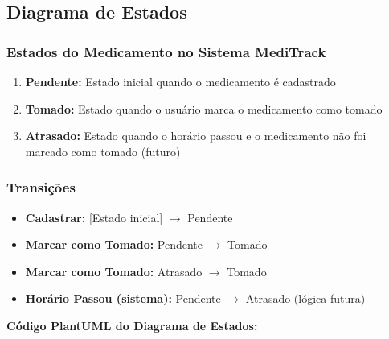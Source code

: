 \documentclass[12pt]{article}
\begin{document}
\subsection{Diagrama de Estados}

\subsubsection{Estados do Medicamento no Sistema MediTrack}

\begin{enumerate}
    \item \textbf{Pendente:} Estado inicial quando o medicamento é cadastrado
    \item \textbf{Tomado:} Estado quando o usuário marca o medicamento como tomado
    \item \textbf{Atrasado:} Estado quando o horário passou e o medicamento não foi marcado como tomado (futuro)
\end{enumerate}

\subsubsection{Transições}

\begin{itemize}
    \item \textbf{Cadastrar:} [Estado inicial] $\rightarrow$ Pendente
    \item \textbf{Marcar como Tomado:} Pendente $\rightarrow$ Tomado
    \item \textbf{Marcar como Tomado:} Atrasado $\rightarrow$ Tomado
    \item \textbf{Horário Passou (sistema):} Pendente $\rightarrow$ Atrasado (lógica futura)
\end{itemize}


\textbf{Código PlantUML do Diagrama de Estados:}
\end{document}
